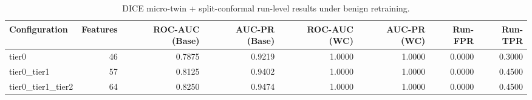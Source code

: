 \begin{table}[t]
\centering
\caption{DICE micro-twin + split-conformal run-level results under benign retraining.}
\label{tab:dice_full_overall}
\footnotesize
\begin{tabular}{lrrrrrrr}
\toprule
Configuration & Features & ROC-AUC (Base) & AUC-PR (Base) & ROC-AUC (WC) & AUC-PR (WC) & Run-FPR & Run-TPR \\
\midrule
tier0 & 46 & 0.7875 & 0.9219 & 1.0000 & 1.0000 & 0.0000 & 0.3000 \\
tier0_tier1 & 57 & 0.8125 & 0.9402 & 1.0000 & 1.0000 & 0.0000 & 0.4500 \\
tier0_tier1_tier2 & 64 & 0.8250 & 0.9474 & 1.0000 & 1.0000 & 0.0000 & 0.4500 \\
\bottomrule
\end{tabular}

\end{table}
